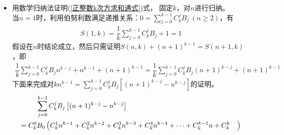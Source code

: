 \begin{itemize}[leftmargin=\inteval{\myitemleftmargin}pt,itemsep=
   \inteval{\myitemitempsep}pt,topsep=\inteval{\myitemtopsep}pt]
也能发现一些规律，比如
\begin{align*}
    S(n,6) =&\ \dfrac{n^6}{6} +\dfrac{n^5}{2}+\dfrac{5n^4}{12}-\dfrac{n^2}{12}\\
    \dfrac{\partial S}{\partial n}(n,6)=&\ n^5+\dfrac{5n^4}{2}+
    \dfrac{5n^3}{3}-\dfrac{n}{6}=5S(n,5)+B_5 \\
    S(n,5) =&\ \dfrac{n^5}{5}+\dfrac{n^4}{2}+\dfrac{n^3}{3}-\dfrac{n}{30} \\
    \dfrac{\partial S}{\partial n}(n,5)=&\ n^4+2n^3+n^2-\dfrac{1}{30}=4S(n,4)+B_4
\end{align*}
该规律就是：$ \dfrac{\partial S}{\partial n}(n,k+1)=kS(n,k)+B_k $，证明如下：
\begin{align*}
    &\ \dfrac{\partial S}{\partial n}\left(\dfrac{1}{k+1}\sum_{j=0}^{k}
    C_{k+1}^{j}B_{j}n^{k+1-j}+n^{k}\right)-B_k\\
    =&\ \sum_{j=0}^{k}\dfrac{k+1-j}{k+1}C_{k+1}^{j}B_{j}n^{k-j}+kn^{k-1}-B_k \\
    =&\ \sum_{j=0}^{k-1}C_{k}^{j}B_{j}n^{k-j}+kn^{k-1} \\
    =&\ k\left(\dfrac{1}{k}\sum_{j=0}^{k-1}C_{k}^{j}B_{j}n^{k-j}+n^{k-1} \right)  \\
    =&\ kS(n,k)
\end{align*}
上面用到了$ \dfrac{k+1-j}{k+1}C_{k+1}^j=\dfrac{k+1-j}{k+1}\cdot
\dfrac{(k+1)!}{(k+1-j)!j!}=\dfrac{k!}{(k-j)!j!}=C_k^j $.
\item 用数学归纳法证明(\ref{正整数k次方求和通式})式，
固定$ k $，对$ n $进行归纳。\\
当$ n=1 $时，利用伯努利数满足递推关系：$ 0=\sum\limits_{j=0}^{k-1}C_k^jB_j\ (n\geq 2) $，有
\begin{align*}
    S(1,k)=\dfrac{1}{k}\sum_{j=0}^{k-1}C_{k}^{j}B_{j}+1=1
\end{align*}
假设在$ n $时结论成立，然后只需证明$ S(n,k)+(n+1)^{k-1}=S(n+1,k) $，即
\begin{align*}
    \dfrac{1}{k}\sum_{j=0}^{k-1}C_{k}^{j}B_{j}n^{k-j}+n^{k-1}+(n+1)^{k-1}
    =\dfrac{1}{k}\sum_{j=0}^{k-1}C_{k}^{j}B_{j}(n+1)^{k-j}+(n+1)^{k-1}
\end{align*}
下面来完成对$ kn^{k-1} =\sum\limits_{j=0}^{k-1}C_{k}^{j}B_{j}\left[
(n+1)^{k-j}-n^{k-j}\right] $的证明。
{\small \begin{align*}
        \sum\limits_{j=0}^{k-1}C_{k}^{j}B_{j}\left[(n+1)^{k-j}-n^{k-j}\right] 
        \hspace{5.8cm} &  \\
        = C_k^0B_0\left(C_k^1n^{k-1}+C_k^2n^{k-2}+C_k^3n^{k-3}+C_k^4n^{k-4}+\cdots+C_k^{k-1}n+C_k^k\quad \right) &\\

\end{align*}}
\end{itemize}
